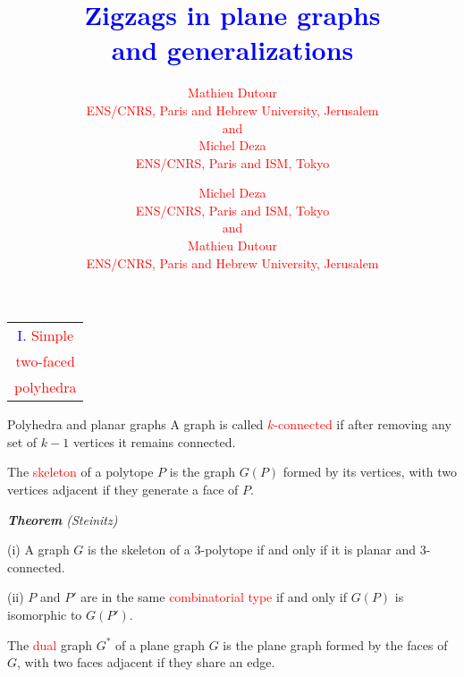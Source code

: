 \documentclass[%
pdf,
colorBG,
slideColor,
]{prosper}
\title{\Huge \textcolor{blue}{Zigzags in plane graphs}\\[3mm]
\textcolor{blue}{and generalizations}}
\author{
\textcolor{red}{\Large Mathieu Dutour}\\[2mm]
\textcolor{red}{\large ENS/CNRS, Paris and Hebrew University, Jerusalem}\\[2mm]
\textcolor{red}{and}\\[2mm]
\textcolor{red}{\Large Michel Deza}\\[2mm]
\textcolor{red}{\large ENS/CNRS, Paris and ISM, Tokyo}\\[2mm]
}
\author{
\textcolor{red}{\Large Michel Deza}\\[2mm]
\textcolor{red}{\large ENS/CNRS, Paris and ISM, Tokyo}\\[2mm]
\textcolor{red}{and}\\[2mm]
\textcolor{red}{\Large Mathieu Dutour}\\[2mm]
\textcolor{red}{\large ENS/CNRS, Paris and Hebrew University, Jerusalem}\\[2mm]
}
\date{}
\begin{document}
\maketitle




\begin{slide}{}
\begin{center}
{\Huge 
\begin{tabular*}{5cm}{c}
\\[-0.5cm]
\textcolor{blue}{I. }\textcolor{red}{Simple}\\
\textcolor{red}{two-faced}\\
\textcolor{red}{polyhedra}
\end{tabular*}
}
\end{center}
\end{slide}




\begin{slide}{Polyhedra and planar graphs}
A graph is called \textcolor{red}{$k$-connected} if after removing any set of $k-1$ vertices it remains connected.

\vspace{2mm}

The \textcolor{red}{skeleton} of a polytope $P$ is the graph $G(P)$ formed by its vertices, with two vertices adjacent if they generate a face of $P$.

\vspace{3mm}

{\em {\bf Theorem} (Steinitz)

(i) A graph $G$ is the skeleton of a $3$-polytope if and only if it is planar and $3$-connected.

(ii) $P$ and $P'$ are in the same \textcolor{red}{combinatorial type} if and only if $G(P)$ is isomorphic to $G(P')$.
}

\vspace{3mm}

The \textcolor{red}{dual} graph $G^*$ of a plane graph $G$ is the plane graph formed by the faces of $G$, with two faces adjacent if they share an edge.


\end{slide}
\end{document}
